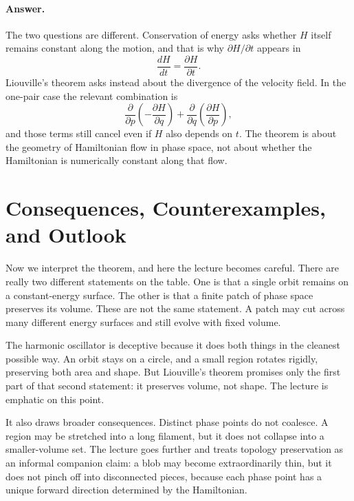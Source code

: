 \paragraph{Answer.} The two questions are different. Conservation of energy asks whether \(H\) itself remains constant along the motion, and that is why \(\partial H/\partial t\) appears in
\begin{equation}
\frac{dH}{dt}=\frac{\partial H}{\partial t}.
\end{equation}
Liouville's theorem asks instead about the divergence of the velocity field. In the one-pair case the relevant combination is
\begin{equation}
\frac{\partial}{\partial p}\!\left(-\frac{\partial H}{\partial q}\right)
+
\frac{\partial}{\partial q}\!\left(\frac{\partial H}{\partial p}\right),
\end{equation}
and those terms still cancel even if \(H\) also depends on \(t\). The theorem is about the geometry of Hamiltonian flow in phase space, not about whether the Hamiltonian is numerically constant along that flow.

\section{Consequences, Counterexamples, and Outlook}

Now we interpret the theorem, and here the lecture becomes careful. There are really two different statements on the table. One is that a single orbit remains on a constant-energy surface. The other is that a finite patch of phase space preserves its volume. These are not the same statement. A patch may cut across many different energy surfaces and still evolve with fixed volume.

The harmonic oscillator is deceptive because it does both things in the cleanest possible way. An orbit stays on a circle, and a small region rotates rigidly, preserving both area and shape. But Liouville's theorem promises only the first part of that second statement: it preserves volume, not shape. The lecture is emphatic on this point.

It also draws broader consequences. Distinct phase points do not coalesce. A region may be stretched into a long filament, but it does not collapse into a smaller-volume set. The lecture goes further and treats topology preservation as an informal companion claim: a blob may become extraordinarily thin, but it does not pinch off into disconnected pieces, because each phase point has a unique forward direction determined by the Hamiltonian.


